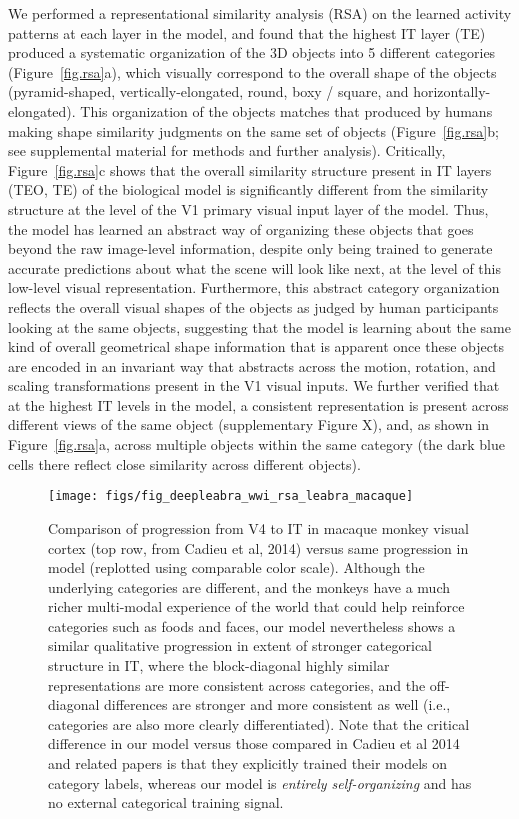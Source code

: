 \documentclass[11pt,twoside]{article}
\newif\myifpdf
\begin{document}
We performed a representational similarity analysis (RSA) on the learned activity patterns at each layer in the model, and found that the highest IT layer (TE) produced a systematic organization of the 3D objects into 5 different categories (Figure~\ref{fig.rsa}a), which visually correspond to the overall shape of the objects (pyramid-shaped, vertically-elongated, round, boxy / square, and horizontally-elongated). This organization of the objects matches that produced by humans making shape similarity judgments on the same set of objects (Figure~\ref{fig.rsa}b; see supplemental material for methods and further analysis).  Critically, Figure~\ref{fig.rsa}c shows that the overall similarity structure present in IT layers (TEO, TE) of the biological model is significantly different from the similarity structure at the level of the V1 primary visual input layer of the model.  Thus, the model has learned an abstract way of organizing these objects that goes beyond the raw image-level information, despite only being trained to generate accurate predictions about what the scene will look like next, at the level of this low-level visual representation.  Furthermore, this abstract category organization reflects the overall visual shapes of the objects as judged by human participants looking at the same objects, suggesting that the model is learning about the same kind of overall geometrical shape information that is apparent once these objects are encoded in an invariant way that abstracts across the motion, rotation, and scaling transformations present in the V1 visual inputs.  We further verified that at the highest IT levels in the model, a consistent representation is present across different views of the same object (supplementary Figure X), and, as shown in Figure~\ref{fig.rsa}a, across multiple objects within the same category (the dark blue cells there reflect close similarity across different objects).

\begin{figure}
  \centering\texttt{[image: figs/fig\_deepleabra\_wwi\_rsa\_leabra\_macaque]}
  \caption{\small Comparison of progression from V4 to IT in macaque monkey visual cortex (top row, from Cadieu et al, 2014) versus same progression in model (replotted using comparable color scale).  Although the underlying categories are different, and the monkeys have a much richer multi-modal experience of the world that could help reinforce categories such as foods and faces, our model nevertheless shows a similar qualitative progression in extent of stronger categorical structure in IT, where the block-diagonal highly similar representations are more consistent across categories, and the off-diagonal differences are stronger and more consistent as well (i.e., categories are also more clearly differentiated).  Note that the critical difference in our model versus those compared in Cadieu et al 2014 and related papers is that they explicitly trained their models on category labels, whereas our model is {\em entirely self-organizing} and has no external categorical training signal.}
  \label{fig.macaque}
\end{figure}
\end{document}
